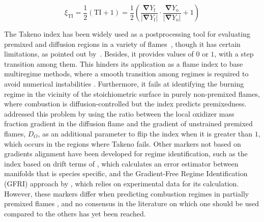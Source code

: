 \documentclass[preprint,12pt,authoryear]{elsarticle}
\newcommand{\dmm}[1]{{\color{blue}{#1}}}
\begin{document}
\begin{equation}
    \label{eq:zeta_TI}
    \xi_\mathrm{TI} = \frac{1}{2} \left( \mathrm{TI} + 1 \right) = \frac{1}{2} \left( \frac{\bm{\nabla} Y_\mathrm{f} }{|\bm{\nabla} Y_\mathrm{f}| } \cdot  \frac{  \bm{\nabla} Y_\mathrm{o}}{ |\bm{\nabla} Y_\mathrm{o}|}  + 1 \right)
 \end{equation}

The Takeno index has been widely used as a postprocessing tool for evaluating premixed and diffusion regions in a variety of flames~\citep{hannebique_large_2013,laera_stabilization_2021}, though it has
certain limitations, as pointed 
out by~\cite{zirwes_identification_2021}. Besides, it provides values of $0$ or $1$, with a step transition among them. This hinders its application as a flame index to base multiregime methods, where a smooth transition among regimes is required to avoid numerical instabilities \citep{kleinheinz_computational_2017}. Furthermore, it fails at identifying the burning regime in the vicinity of the stoichiometric surface in purely non-premixed flames, where combustion is diffusion-controlled but the index predicts premixedness. \cite{fiorina_approximating_2005} addressed this problem by using the ratio between the local oxidizer mass fraction gradient in the diffusion flame and the gradient of unstrained premixed flames, $D_O$, as an additional parameter to flip the index when it is greater than $1$, which occurs in the regions where Takeno fails. Other markers not based on gradients alignment have been developed for regime identification, such as the index based on drift terms of \cite{wu_compliance_2016}, which calculates an error estimator between manifolds that is species specific, and the Gradient-Free Regime Identification (GFRI) approach by \cite{butz_local_2019}, which relies on experimental data for its calculation. However, these markers differ when predicting combustion regimes in partially premixed flames \citep{zirwes_identification_2021}, and no consensus in the literature on which one should be used compared to the others has yet been reached.



\end{document}
